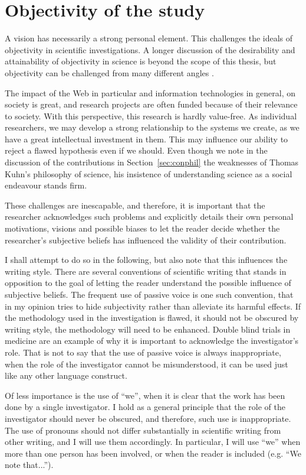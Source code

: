\section{Objectivity of the study}

A vision has necessarily a strong personal element. This challenges
the ideals of objectivity in scientific investigations. A longer
discussion of the desirability and attainability of objectivity in
science is beyond the scope of this thesis, but objectivity can be
challenged from many different angles
\cite{sep-scientific-objectivity}.

The impact of the Web in particular and information technologies in
general, on society is great, and research projects are often funded
because of their relevance to society. With this perspective, this
research is hardly value-free. As individual researchers, we may
develop a strong relationship to the systems we create, as we have a
great intellectual investment in them. This may influence our ability
to reject a flawed hypothesis even if we should. Even though we note
in the discussion of the contributions in Section~\ref{sec:conphil}
the weaknesses of Thomas Kuhn's philosophy of science, his insistence
of understanding science as a social endeavour stands firm.

These challenges are inescapable, and therefore, it is important that
the researcher acknowledges such problems and explicitly details their
own personal motivations, visions and possible biases to let the
reader decide whether the researcher's subjective beliefs has
influenced the validity of their contribution. 

I shall attempt to do so in the following, but also note that this
influences the writing style. There are several conventions of
scientific writing that stands in opposition to the goal of letting
the reader understand the possible influence of subjective
beliefs. The frequent use of passive voice is one such convention,
that in my opinion tries to hide subjectivity rather than alleviate
its harmful effects. If the methodology used in the investigation is
flawed, it should not be obscured by writing style, the methodology
will need to be enhanced. Double blind trials in medicine are an
example of why it is important to acknowledge the investigator's
role. That is not to say that the use of passive voice is always
inappropriate, when the role of the investigator cannot be
misunderstood, it can be used just like any other language construct.

Of less importance is the use of ``we'', when it is clear that the
work has been done by a single investigator. I hold as a general
principle that the role of the investigator should never be obscured,
and therefore, such use is inappropriate. The use of pronouns should
not differ substantially in scientific writing from other writing, and
I will use them accordingly. In particular, I will use ``we'' when
more than one person has been involved, or when the reader is included
(e.g. ``We note that...'').

